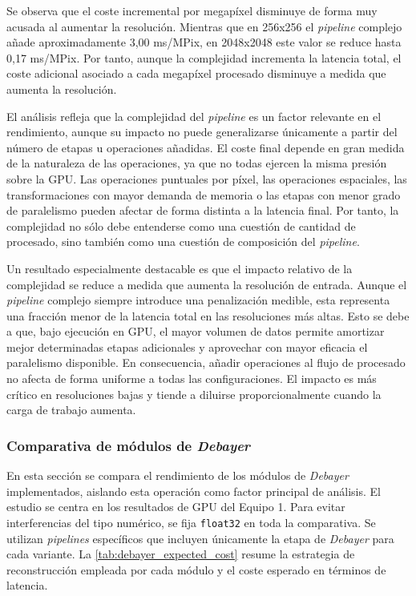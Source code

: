 

Se observa que el coste incremental por megapíxel disminuye de forma muy acusada al aumentar la resolución. 
Mientras que en 256x256 el \textit{pipeline} complejo añade aproximadamente 3,00 ms/MPix, en 2048x2048 este 
valor se reduce hasta 0,17 ms/MPix. Por tanto, aunque la complejidad incrementa la latencia total, el coste 
adicional asociado a cada megapíxel procesado disminuye a medida que aumenta la resolución.

\vspace{2em}

El análisis refleja que la complejidad del \textit{pipeline} es un
factor relevante en el rendimiento, aunque su impacto no puede generalizarse
únicamente a partir del número de etapas u operaciones añadidas. El coste final depende
en gran medida de la naturaleza de las operaciones, ya que no todas ejercen
la misma presión sobre la GPU. Las operaciones puntuales por píxel, las operaciones
espaciales, las transformaciones con mayor demanda de memoria o
las etapas con menor grado de paralelismo pueden afectar de forma distinta a la latencia
final. Por tanto, la complejidad no sólo debe entenderse como una cuestión de cantidad de
procesado, sino también como una cuestión de composición del \textit{pipeline}.

Un resultado especialmente destacable es que el impacto relativo de la complejidad se
reduce a medida que aumenta la resolución de entrada. Aunque el \textit{pipeline} complejo
siempre introduce una penalización medible, esta representa una fracción menor de la
latencia total en las resoluciones más altas. Esto se debe a que, bajo ejecución en GPU, el
mayor volumen de datos permite amortizar mejor determinadas etapas adicionales y aprovechar
con mayor eficacia el paralelismo disponible. En consecuencia, añadir operaciones al flujo
de procesado no afecta de forma uniforme a todas las configuraciones. El impacto es más
crítico en resoluciones bajas y tiende a diluirse proporcionalmente cuando la carga de
trabajo aumenta.

\newpage

\subsubsection{Comparativa de módulos de \textit{Debayer}} \label{subsubsec:debayer_comparison}

En esta sección se compara el rendimiento de los módulos de \textit{Debayer}
implementados, aislando esta operación como factor principal de análisis.
El estudio se centra en los resultados de GPU del Equipo 1. Para evitar interferencias
del tipo numérico, se fija \texttt{float32} en toda la comparativa. Se utilizan \textit{pipelines}
específicos que incluyen únicamente la etapa de \textit{Debayer} para cada variante. La 
\autoref{tab:debayer_expected_cost} resume la estrategia de reconstrucción empleada por cada módulo 
y el coste esperado en términos de latencia.

